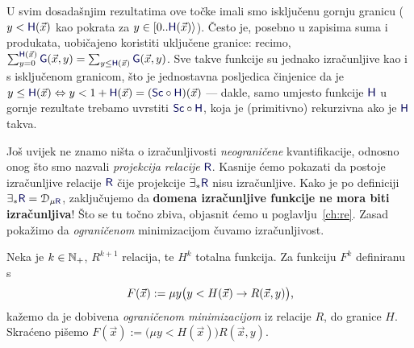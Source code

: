 \begin{napomena}[{name=[granice mogu biti i uključene]}]\label{nap:kvantSc}
U svim dosadašnjim rezultatima ove točke imali smo isključenu gornju granicu ($y<\f H(\vec x)$ kao pokrata za $y\in[0..\f H(\vec x)\rangle$). Često je, posebno u zapisima suma i produkata, uobičajeno koristiti uključene granice: recimo, $\sum_{y=0}^{\f H(\vec x)}\f G(\vec x,y)=\sum_{y\le\f H(\vec x)}\f G(\vec x,y)$. Sve takve funkcije su jednako izračunljive kao i s isključenom granicom, što je jednostavna posljedica činjenice da je $y\le\f H(\vec x)\Leftrightarrow y<1+\f H(\vec x)=(\f{Sc}\circ\f H)(\vec x)$ --- dakle, samo umjesto funkcije $\f H$ u gornje rezultate trebamo uvrstiti $\f{Sc}\circ\f H$, koja je (primitivno) rekurzivna ako je $\f H$ takva.
%
\end{napomena}

Još uvijek ne znamo ništa o izračunljivosti \emph{neograničene} kvantifikacije, odnosno onog što smo nazvali \emph{projekcija relacije} $\f R$. Kasnije ćemo pokazati da postoje izračunljive relacije $\f R$ čije projekcije $\exists_*\f R$ nisu izračunljive. Kako je po definiciji $\exists_*\f R=\dom{\mu\f R}$, zaključujemo da \textbf{domena izračunljive funkcije ne mora biti izračunljiva}! Što se tu točno zbiva, objasnit ćemo u poglavlju~\ref{ch:re}. Zasad pokažimo da \emph{ograničenom} minimizacijom čuvamo izračunljivost.


\begin{definicija}[{name=[ograničena minimizacija]}]
Neka je $k\in{\mathbb N}_+$, $R^{k+1}$ relacija, te $H^k$ totalna funkcija. Za funkciju $F^k$ definiranu s
\begin{equation}
    F(\vec x):=\mu y\bigl(y<H(\vec x)\to R(\vec x,y)\bigr)\text,
\end{equation}
kažemo da je dobivena \emph{ograničenom minimizacijom} iz relacije $R$, do granice $H$. Skraćeno pišemo $F(\vec x):=\bigl(\mu y<H(\vec x)\bigr)R(\vec x,y)$.
\end{definicija}

